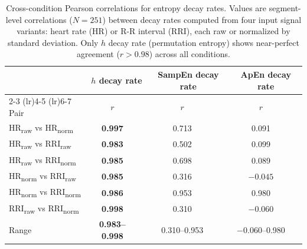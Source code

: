 
\begin{table}[htbp]
\centering
\caption{Cross-condition Pearson correlations for entropy decay rates.
Values are segment-level correlations ($N=251$) between decay rates computed from
four input signal variants: heart rate (HR) or R-R interval (RRI), each raw or
normalized by standard deviation. Only $h$ decay rate (permutation entropy) shows
near-perfect agreement ($r > 0.98$) across all conditions.}
\label{tab:robustness_correlations}
\small
\begin{tabular}{l cccccc}
\toprule
& \multicolumn{2}{c}{$h$ decay rate} & \multicolumn{2}{c}{SampEn decay rate} & \multicolumn{2}{c}{ApEn decay rate} \\
\cmidrule(lr){2-3} \cmidrule(lr){4-5} \cmidrule(lr){6-7}
Pair & $r$ & & $r$ & & $r$ & \\
\midrule
HR\textsubscript{raw} vs HR\textsubscript{norm}   & \textbf{0.997} & & 0.713 & & 0.091 \\
HR\textsubscript{raw} vs RRI\textsubscript{raw}   & \textbf{0.983} & & 0.502 & & 0.099 \\
HR\textsubscript{raw} vs RRI\textsubscript{norm}  & \textbf{0.985} & & 0.698 & & 0.089 \\
HR\textsubscript{norm} vs RRI\textsubscript{raw}  & \textbf{0.985} & & 0.316 & & $-0.045$ \\
HR\textsubscript{norm} vs RRI\textsubscript{norm} & \textbf{0.986} & & 0.953 & & 0.980 \\
RRI\textsubscript{raw} vs RRI\textsubscript{norm} & \textbf{0.998} & & 0.310 & & $-0.060$ \\
\midrule
Range & \textbf{0.983--0.998} & & 0.310--0.953 & & $-0.060$--0.980 \\
\bottomrule
\end{tabular}
\end{table}

